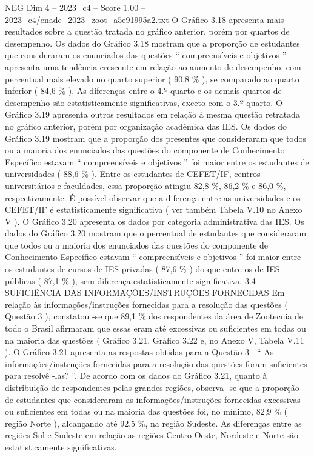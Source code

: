 \begin{textsample}{NEG Dim 4 – 2023\_c4 – Score 1.00 – 2023\_c4/enade\_2023\_zoot\_a5e91995a2.txt}
O Gráfico 3.18 apresenta mais resultados sobre a questão tratada no gráfico anterior, porém por quartos de desempenho.
Os dados do Gráfico 3.18 mostram que a proporção de estudantes que consideraram os enunciados das questões “ compreensíveis e objetivos ” apresenta uma tendência crescente em relação ao aumento de desempenho, com percentual mais elevado no quarto superior ( 90,8 \% ), se comparado ao quarto inferior ( 84,6 \% ).
As diferenças entre o 4.º quarto e os demais quartos de desempenho são estatisticamente significativas, exceto com o 3.º quarto.
O Gráfico 3.19 apresenta outros resultados em relação à mesma questão retratada no gráfico anterior, porém por organização acadêmica das IES.
Os dados do Gráfico 3.19 mostram que a proporção dos presentes que consideraram que todos ou a maioria dos enunciados das questões do componente de Conhecimento Específico estavam “ compreensíveis e objetivos ” foi maior entre os estudantes de universidades ( 88,6 \% ).
Entre os estudantes de CEFET/IF, centros universitários e faculdades, essa proporção atingiu 82,8 \%, 86,2 \% e 86,0 \%, respectivamente.
É possível observar que a diferença entre as universidades e os CEFET/IF é estatisticamente significativa ( ver também Tabela V.10 no Anexo V ).
O Gráfico 3.20 apresenta os dados por categoria administrativa das IES.
Os dados do Gráfico 3.20 mostram que o percentual de estudantes que consideraram que todos ou a maioria dos enunciados das questões do componente de Conhecimento Específico estavam “ compreensíveis e objetivos ” foi maior entre os estudantes de cursos de IES privadas ( 87,6 \% ) do que entre os de IES públicas ( 87,1 \% ), sem diferença estatisticamente significativa. 3.4 SUFICIÊNCIA DAS INFORMAÇÕES/INSTRUÇÕES FORNECIDAS Em relação às informações/instruções fornecidas para a resolução das questões ( Questão 3 ), constatou -se que 89,1 \% dos respondentes da área de Zootecnia de todo o Brasil afirmaram que essas eram até excessivas ou suficientes em todas ou na maioria das questões ( Gráfico 3.21, Gráfico 3.22 e, no Anexo V, Tabela V.11 ).
O Gráfico 3.21 apresenta as respostas obtidas para a Questão 3 : “ As informações/instruções fornecidas para a resolução das questões foram suficientes para resolvê -las? ”.
De acordo com os dados do Gráfico 3.21, quanto à distribuição de respondentes pelas grandes regiões, observa -se que a proporção de estudantes que consideraram as informações/instruções fornecidas excessivas ou suficientes em todas ou na maioria das questões foi, no mínimo, 82,9 \% ( região Norte ), alcançando até 92,5 \%, na região Sudeste.
As diferenças entre as regiões Sul e Sudeste em relação as regiões Centro-Oeste, Nordeste e Norte são estatisticamente significativas.

\end{textsample}
